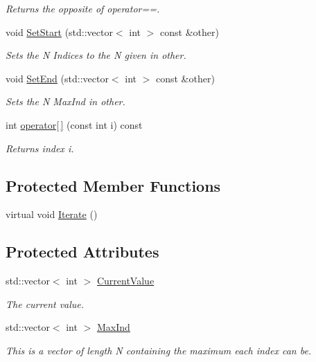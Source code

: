 \begin{DoxyCompactItemize}
\begin{DoxyCompactList}\small\item\em Returns the opposite of operator==. \item\end{DoxyCompactList}\item 
void \hyperlink{classJKBuilder_1_1Iterator_aa83de505e29125c1d3ac7bb1b13ca15a}{SetStart} (std::vector$<$ int $>$ const \&other)
\begin{DoxyCompactList}\small\item\em Sets the N Indices to the N given in other. \item\end{DoxyCompactList}\item 
void \hyperlink{classJKBuilder_1_1Iterator_aad84ec668b5f41210db34c540aaa31fc}{SetEnd} (std::vector$<$ int $>$ const \&other)
\begin{DoxyCompactList}\small\item\em Sets the N MaxInd in other. \item\end{DoxyCompactList}\item 
int \hyperlink{classJKBuilder_1_1Iterator_a74247cf730a06b23fcb1ec64e5596b25}{operator\mbox{[}$\,$\mbox{]}} (const int i) const 
\begin{DoxyCompactList}\small\item\em Returns index i. \item\end{DoxyCompactList}\end{DoxyCompactItemize}
\subsection*{Protected Member Functions}
\begin{DoxyCompactItemize}
\item 
virtual void \hyperlink{classJKBuilder_1_1Iterator_a7874a07e98b52f4f147cde6f39353bae}{Iterate} ()
\end{DoxyCompactItemize}
\subsection*{Protected Attributes}
\begin{DoxyCompactItemize}
\item 
std::vector$<$ int $>$ \hyperlink{classJKBuilder_1_1Iterator_a20ca24f6d827aba144bb087c4bcb74a0}{CurrentValue}
\begin{DoxyCompactList}\small\item\em The current value. \item\end{DoxyCompactList}\item 
std::vector$<$ int $>$ \hyperlink{classJKBuilder_1_1Iterator_ab6b56d3c4e9353bc938dd6249cde9ca0}{MaxInd}
\begin{DoxyCompactList}\small\item\em This is a vector of length N containing the maximum each index can be. \item\end{DoxyCompactList}\end{DoxyCompactItemize}


